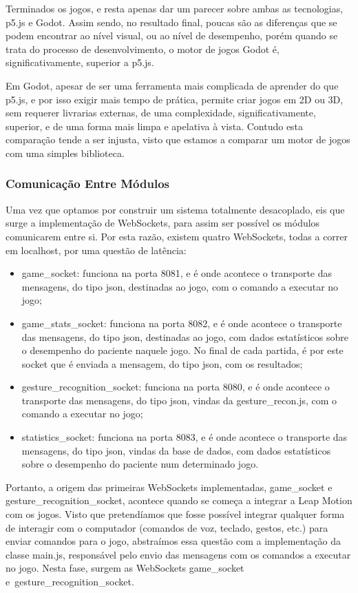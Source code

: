 \documentclass{TTUPhD}
\begin{document}
Terminados os jogos, e resta apenas dar um parecer sobre ambas as tecnologias, p5.js e Godot. Assim sendo, no resultado final, poucas são as diferenças que se podem encontrar ao nível visual, ou ao nível de desempenho, porém quando se trata do processo de desenvolvimento, o motor de jogos Godot é, significativamente, superior a p5.js.

Em Godot, apesar de ser uma ferramenta mais complicada de aprender do que p5.js, e por isso exigir mais tempo de prática, permite criar jogos em 2D ou 3D, sem requerer livrarias externas, de uma complexidade, significativamente, superior, e de uma forma mais limpa e apelativa à vista. Contudo esta comparação tende a ser injusta, visto que estamos a comparar um motor de jogos com uma simples biblioteca.

\subsubsection{Comunicação Entre Módulos}

Uma vez que optamos por construir um sistema totalmente desacoplado, eis que surge a implementação de WebSockets, para assim ser possível os módulos comunicarem entre si. Por esta razão, existem quatro WebSockets, todas a correr em localhost, por uma questão de latência:

\begin{itemize}
    \item game\_socket: funciona na porta 8081, e é onde acontece o transporte das mensagens, do tipo json, destinadas ao jogo, com o comando a executar no jogo;
    \item game\_stats\_socket: funciona na porta 8082, e é onde acontece o transporte das mensagens, do tipo json, destinadas ao jogo, com dados estatísticos sobre o desempenho do paciente naquele jogo. No final de cada partida, é por este socket que é enviada a mensagem, do tipo json, com os resultados;
    \item gesture\_recognition\_socket: funciona na porta 8080, e é onde acontece o transporte das mensagens, do tipo json, vindas da gesture\_recon.js, com o comando a executar no jogo;
    \item statistics\_socket: funciona na porta 8083, e é onde acontece o transporte das mensagens, do tipo json, vindas da base de dados, com dados estatísticos sobre o desempenho do paciente num determinado jogo.
\end{itemize}

Portanto, a origem das primeiras WebSockets implementadas, game\_socket e gesture\_recognition\_socket, acontece quando se começa a integrar a Leap Motion com os jogos. Visto que pretendíamos que fosse possível integrar qualquer forma de interagir com o computador (comandos de voz, teclado, gestos, etc.) para enviar comandos para o jogo, abstraímos essa questão com a implementação da classe main.js, responsável pelo envio das mensagens com os comandos a executar no jogo. Nesta fase, surgem as WebSockets game\_socket e~gesture\_recognition\_socket.
\end{document}
